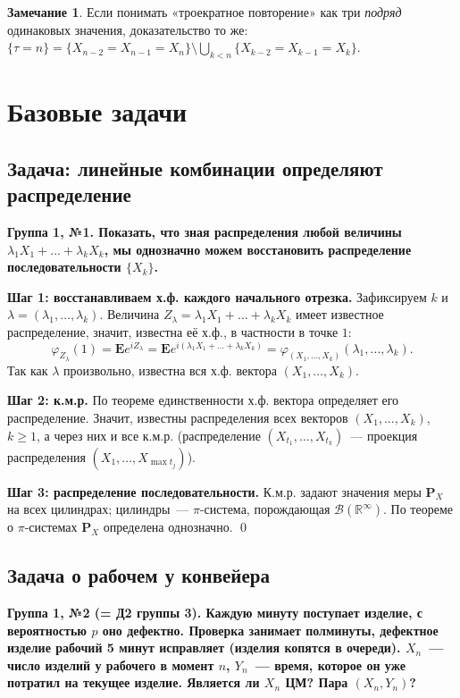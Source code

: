 \documentclass[11pt,a4paper]{article}
\theoremstyle{definition}
\newtheorem{zam}[thm]{Замечание}
\newcommand{\PP}{\mathbf P}
\newcommand{\EE}{\mathbf E}
\newcommand{\R}{\mathbb R}
\newcommand{\B}{\mathcal B}
\newcommand{\1}{\mathbf 1}
\newenvironment{task}[1]{\par\medskip\noindent\colorbox{black!7}{\parbox{\dimexpr\linewidth-2\fboxsep}{\textbf{#1}}}\par\smallskip}{\par}
\begin{document}
\begin{zam}
Если понимать «троекратное повторение» как три \emph{подряд} одинаковых
значения, доказательство то же:
$\{\tau=n\}=\{X_{n-2}=X_{n-1}=X_n\}\setminus\bigcup_{k<n}\{X_{k-2}=X_{k-1}=X_k\}$.
\end{zam}

\section{Базовые задачи}\label{sec:basic}

\subsection{Задача: линейные комбинации определяют распределение}\label{z:cramer}

\begin{task}{Группа 1, №1. Показать, что зная распределения любой величины
$\lambda_1X_1+\dots+\lambda_kX_k$, мы однозначно можем восстановить распределение
последовательности $\{X_k\}$.}
\end{task}
\textbf{Шаг 1: восстанавливаем х.ф. каждого начального отрезка.} Зафиксируем
$k$ и $\lambda=(\lambda_1,\dots,\lambda_k)$. Величина
$Z_\lambda=\lambda_1X_1+\dots+\lambda_kX_k$ имеет известное распределение,
значит, известна её х.ф., в частности в точке $1$:
\[
\varphi_{Z_\lambda}(1)=\EE e^{iZ_\lambda}=\EE e^{i(\lambda_1X_1+\dots+\lambda_kX_k)}
=\varphi_{(X_1,\dots,X_k)}(\lambda_1,\dots,\lambda_k).
\]
Так как $\lambda$ произвольно, известна вся х.ф. вектора $(X_1,\dots,X_k)$.

\textbf{Шаг 2: к.м.р.} По теореме единственности х.ф. вектора определяет его
распределение. Значит, известны распределения всех векторов
$(X_1,\dots,X_k)$, $k\ge1$, а через них и все к.м.р. (распределение
$(X_{t_1},\dots,X_{t_k})$~--- проекция распределения
$(X_1,\dots,X_{\max t_j})$).

\textbf{Шаг 3: распределение последовательности.} К.м.р. задают значения
меры $\PP_X$ на всех цилиндрах; цилиндры~--- $\pi$-система, порождающая
$\B(\R^\infty)$. По теореме о $\pi$-системах $\PP_X$ определена однозначно.
\qed

\subsection{Задача о рабочем у конвейера}\label{z:worker}

\begin{task}{Группа 1, №2 (= Д2 группы 3). Каждую минуту поступает изделие,
с вероятностью $p$ оно дефектно. Проверка занимает полминуты, дефектное
изделие рабочий 5 минут исправляет (изделия копятся в очереди). $X_n$~--- число
изделий у рабочего в момент $n$, $Y_n$~--- время, которое он уже потратил на
текущее изделие. Является ли $X_n$ ЦМ? Пара $(X_n,Y_n)$?}
\end{task}
\end{document}
